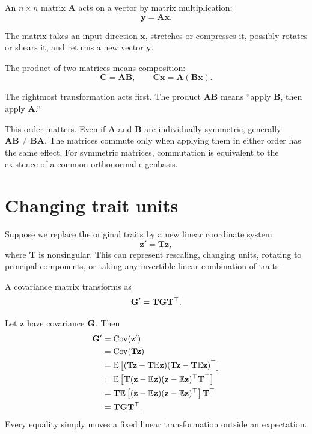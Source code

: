 An \(n\times n\) matrix \(\mathbf A\) acts on a vector by matrix multiplication:
\begin{equation}
\mathbf y=\mathbf A\mathbf x.
\end{equation}

\inwords The matrix takes an input direction \(\mathbf x\), stretches or compresses it, possibly rotates or shears it, and returns a new vector \(\mathbf y\).

The product of two matrices means composition:
\begin{equation}
\mathbf C=\mathbf A\mathbf B,
\qquad
\mathbf C\mathbf x=\mathbf A(\mathbf B\mathbf x).
\end{equation}

\inwords The rightmost transformation acts first. The product \(\mathbf A\mathbf B\) means ``apply \(\mathbf B\), then apply \(\mathbf A\).''

\begin{mathteach}
This order matters. Even if \(\mathbf A\) and \(\mathbf B\) are individually symmetric, generally \(\mathbf A\mathbf B\neq\mathbf B\mathbf A\). The matrices commute only when applying them in either order has the same effect. For symmetric matrices, commutation is equivalent to the existence of a common orthonormal eigenbasis.
\end{mathteach}

\section{Changing trait units}

Suppose we replace the original traits by a new linear coordinate system
\begin{equation}
\mathbf z'=\mathbf T\mathbf z,
\end{equation}
where \(\mathbf T\) is nonsingular. This can represent rescaling, changing units, rotating to principal components, or taking any invertible linear combination of traits.

A covariance matrix transforms as
\begin{equation}
\mathbf{G}'=\mathbf T\mathbf{G}\mathbf T^\top.
\label{eq:Gtransform}
\end{equation}

\begin{derivationbox}
Let \(\mathbf z\) have covariance \(\mathbf{G}\). Then
\begin{align}
\mathbf{G}'
&=\operatorname{Cov}(\mathbf z')\\
&=\operatorname{Cov}(\mathbf T\mathbf z)\\
&=\mathbb E\left[(\mathbf T\mathbf z-\mathbf T\mathbb E\mathbf z)
(\mathbf T\mathbf z-\mathbf T\mathbb E\mathbf z)^\top\right]\\
&=\mathbb E\left[\mathbf T(\mathbf z-\mathbb E\mathbf z)(\mathbf z-\mathbb E\mathbf z)^\top\mathbf T^\top\right]\\
&=\mathbf T\mathbb E\left[(\mathbf z-\mathbb E\mathbf z)(\mathbf z-\mathbb E\mathbf z)^\top\right]\mathbf T^\top\\
&=\mathbf T\mathbf{G}\mathbf T^\top.
\end{align}
Every equality simply moves a fixed linear transformation outside an expectation.
\end{derivationbox}

